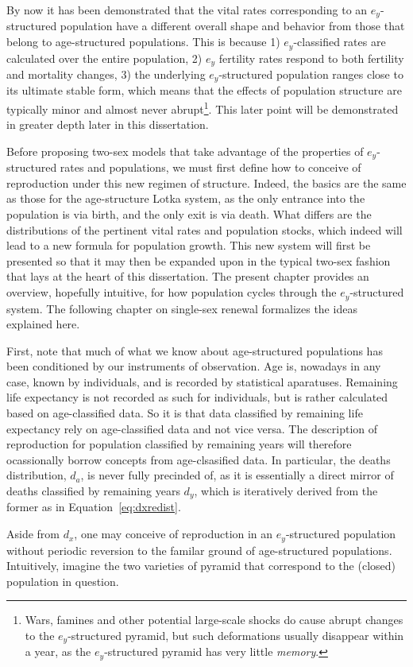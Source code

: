  \FloatBarrier
\label{sec:exstructuredrenewal}
By now it has been demonstrated that the vital rates corresponding to an
$e_y$-structured population have a different overall shape and behavior from
those that belong to age-structured populations. This is because 1) $e_y$-classified rates
are calculated over the entire population, 2) $e_y$ fertility rates respond to
both fertility and mortality changes, 3) the underlying $e_y$-structured
population ranges close to its ultimate stable form, which means that
the effects of population structure are typically minor and almost never
abrupt\footnote{Wars, famines and other potential large-scale shocks do cause
abrupt changes to the $e_y$-structured pyramid, but such deformations usually
disappear within a year, as the  $e_y$-structured pyramid has very little
\textit{memory}.}. This later point will be demonstrated in greater depth later
in this dissertation.

Before proposing two-sex models that take advantage of the properties of
$e_y$-structured rates and populations, we must first define how to conceive of
reproduction under this new regimen of structure. Indeed, the basics are the
same as those for the age-structure Lotka system, as the only entrance into the
population is via birth, and the only exit is via death. What differs are the
distributions of the pertinent vital rates and population stocks, which indeed
will lead to a new formula for population growth. This new system will first be
presented so that it may then be expanded upon in the typical two-sex fashion
that lays at the heart of this dissertation. The present chapter provides an
overview, hopefully intuitive, for how population cycles through the
$e_y$-structured system. The following chapter on single-sex renewal formalizes
the ideas explained here.

First, note that much of what we know about age-structured populations has been
conditioned by our instruments of observation. Age is, nowadays in any case,
known by individuals, and is recorded by statistical aparatuses. Remaining life
expectancy is not recorded as such for individuals, but is rather calculated
based on age-classified data. So it is that data classified by remaining
life expectancy rely on age-classified data and not vice versa. The description of 
reproduction for population classified by remaining years will therefore
ocassionally borrow concepts from age-clsasified data. In particular, the deaths
distribution, $d_a$, is never fully precinded of, as it is essentially a direct
mirror of deaths classified by remaining years $d_y$, which is
iteratively derived from the former as in Equation~\eqref{eq:dxredist}.

Aside from $d_x$, one may conceive of reproduction in an $e_y$-structured
population without periodic reversion to the familar ground of age-structured populations.
Intuitively, imagine the two varieties of pyramid that correspond to the
(closed) population in question. 